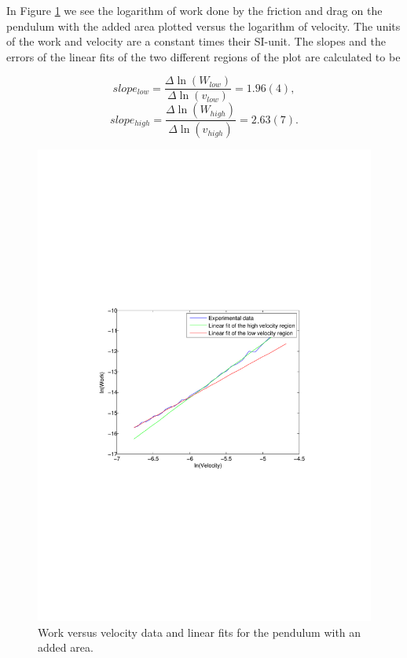 \documentclass[11pt, a4paper]{article}
\begin{document}
In Figure \ref{f:paper} we see the logarithm of work done by the friction and 
drag on the pendulum with the added area plotted versus the logarithm of velocity. 
The units of the work and velocity are a constant times their SI-unit. 
The slopes and the errors of the linear fits of the two different regions of the plot are calculated to be

\[
	slope_{low}=\frac{\Delta\ln(W_{low})}{\Delta\ln(v_{low})} = 1.96(4),
\]\[
	slope_{high}=\frac{\Delta\ln(W_{high})}{\Delta\ln(v_{high})} = 2.63(7).
\]

\begin{figure}[h]
	\centering
	\includegraphics[trim=10.0cm 10.0cm 10.0cm 10.0cm, scale=0.7]{paper}
	\caption{Work versus velocity data and  linear fits for the pendulum with an added area.}
	\label{f:paper}
\end{figure}
\end{document}
